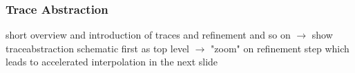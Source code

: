 \begin{frame}[t]
	\frametitle{Trace Abstraction}
	short overview and introduction of traces and refinement and so on $\rightarrow$
	show traceabstraction schematic first as top level $\rightarrow$ "zoom" on refinement step which leads to accelerated interpolation in the next slide
\end{frame}